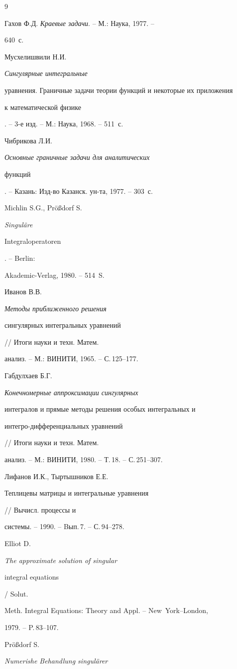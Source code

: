 \begin{thebibliography}{9}





 Гахов Ф.Д. {\it Краевые задачи}. -- М.: Наука, 1977. --


640~с.


 Мусхелишвили Н.И. {\it Сингулярные интегральные


уравнения. Граничные задачи теории функций и некоторые их приложения


к математической физике}. -- 3-е изд. -- М.: Наука, 1968. -- 511~с.


 Чибрикова Л.И. {\it Основные граничные задачи для аналитических


функций}. -- Казань: Изд-во Казанск. ун-та, 1977. -- 303~с.


 Michlin S.G., Pr\"o\ss{}dorf S. {\it Singul\"{a}re


Integraloperatoren}. -- Berlin:


Akademic-Verlag, 1980. -- 514~S.


 Иванов В.В. {\it Методы приближенного решения


сингулярных интегральных уравнений} // Итоги науки и техн. Матем.


анализ. -- М.: ВИНИТИ, 1965. -- С.\,125--177.


 Габдулхаев Б.Г. {\it \it Конечномерные аппроксимации сингулярных


интегралов и прямые методы решения особых интегральных и 


интегро-дифференциальных уравнений} // Итоги науки и техн. Матем.


анализ. -- М.: ВИНИТИ, 1980. -- Т.\,18. -- С.\,251--307.


 Лифанов И.К., Тыртышников Е.Е. {\it


Теплицевы матрицы и интегральные уравнения} // Вычисл. процессы и


системы. -- 1990. -- Bып.\,7. -- С.\,94--278.


  Elliot D. {\it The approximate solution of singular


integral equations} / Solut.


Meth. Integral Equations: Theory and Appl. -- New~York--London,


1979. -- P.\,83--107.


 Pr\"{o}\ss{}dorf S. {\it Numerishe Behandlung singul\"{a}rer


}
\end{thebibliography}
